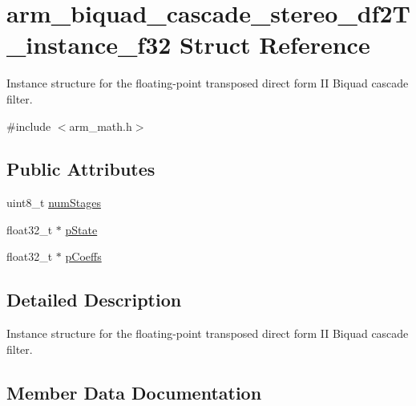 \hypertarget{structarm__biquad__cascade__stereo__df2T__instance__f32}{}\section{arm\+\_\+biquad\+\_\+cascade\+\_\+stereo\+\_\+df2\+T\+\_\+instance\+\_\+f32 Struct Reference}
\label{structarm__biquad__cascade__stereo__df2T__instance__f32}


Instance structure for the floating-\/point transposed direct form II Biquad cascade filter.  




{\ttfamily \#include $<$arm\+\_\+math.\+h$>$}

\subsection*{Public Attributes}
\begin{DoxyCompactItemize}
\item 
uint8\+\_\+t \hyperlink{structarm__biquad__cascade__stereo__df2T__instance__f32_a5655328252da5c2c2425ceed253bc4f1}{num\+Stages}
\item 
float32\+\_\+t $\ast$ \hyperlink{structarm__biquad__cascade__stereo__df2T__instance__f32_a2cb00048bb1fe957a03c1ff56dfaf8f0}{p\+State}
\item 
float32\+\_\+t $\ast$ \hyperlink{structarm__biquad__cascade__stereo__df2T__instance__f32_a58b15644de62a632c5e9d4a563569dc6}{p\+Coeffs}
\end{DoxyCompactItemize}


\subsection{Detailed Description}
Instance structure for the floating-\/point transposed direct form II Biquad cascade filter. 

\subsection{Member Data Documentation}
